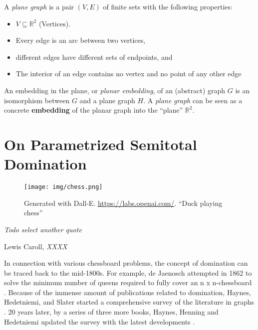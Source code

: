 \begin{graphclass}[Planar]

A \textit{plane graph} is a pair $(V,E)$ of finite sets with the following properties:

\begin{itemize}
    \item $V \subseteq \mathbb{R}^2$ (Vertices).
    \vspace{-2mm}
    \item Every edge is an arc between two vertices, 
    \vspace{-2mm}
    \item different edges have different sets of endpoints, and
    \vspace{-2mm}
    \item The interior of an edge contains no vertex and no point of any other edge
\end{itemize}

An embedding in the plane, or \textit{planar embedding}, of an (abstract) graph $G$ is an isomorphism between $G$ and a plane graph $H$. A \textit{plane graph} can be seen as a concrete \textbf{embedding} of the planar graph into the ``plane'' $\mathbb{R}^2$.

\end{graphclass}



\chapter{On Parametrized Semitotal Domination}\label{ch:semitotal-domination}

\vspace*{-50pt}

\begin{figure}[ht]
        \texttt{[image: img/chess.png]}
        \captionsetup{textformat=empty,labelformat=blank}
        \caption{Generated with Dall-E. \url{https://labs.openai.com/}. ``Duck playing chess''}
\end{figure}

\epigraph{\itshape Todo select another quote}{Lewis Caroll, \textit{XXXX}}

In connection with various chessboard problems, the concept of domination can be traced back to the mid-1800s.
For example, de Jaenosch attempted in 1862 to solve the minimum number of queens required to fully cover an n x n-chessboard \cite{Jaenisch1862}. Because of the immense amount of publications related to domination, Haynes, Hedetniemi, and Slater started a comprehensive survey of the literature in graphs \cite{Haynes1998, Haynes1998b}. 
20 years later, by a series of three more books, Haynes, Henning and Hedetniemi updated the survey with the latest developments \cite{Haynes2020, Haynes2021, Haynes2022}.

